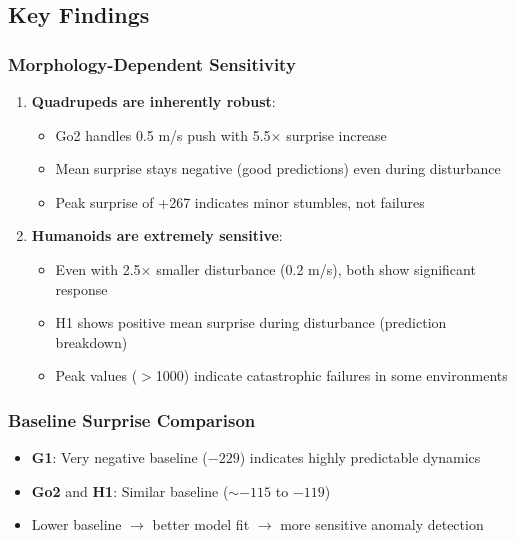 \documentclass[11pt,a4paper]{article}
\begin{document}
\subsection{Key Findings}

\subsubsection{Morphology-Dependent Sensitivity}

\begin{enumerate}
    \item \textbf{Quadrupeds are inherently robust}:
    \begin{itemize}
        \item Go2 handles 0.5 m/s push with 5.5$\times$ surprise increase
        \item Mean surprise stays negative (good predictions) even during disturbance
        \item Peak surprise of +267 indicates minor stumbles, not failures
    \end{itemize}
    
    \item \textbf{Humanoids are extremely sensitive}:
    \begin{itemize}
        \item Even with 2.5$\times$ smaller disturbance (0.2 m/s), both show significant response
        \item H1 shows positive mean surprise during disturbance (prediction breakdown)
        \item Peak values ($>$1000) indicate catastrophic failures in some environments
    \end{itemize}
\end{enumerate}

\subsubsection{Baseline Surprise Comparison}

\begin{itemize}
    \item \textbf{G1}: Very negative baseline ($-229$) indicates highly predictable dynamics
    \item \textbf{Go2} and \textbf{H1}: Similar baseline ($\sim -115$ to $-119$)
    \item Lower baseline $\rightarrow$ better model fit $\rightarrow$ more sensitive anomaly detection
\end{itemize}
\end{document}
